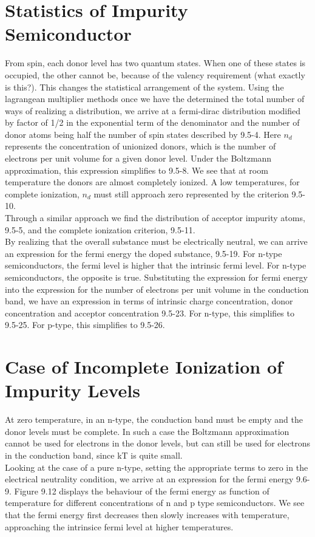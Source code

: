 \documentclass{article}
\numberwithin{equation}{section}
\begin{document}
\section*{Statistics of Impurity Semiconductor}From spin, each donor level has two quantum states. When one of these states is occupied, the other cannot be, because of the valency requirement (what exactly is this?). This changes the statistical arrangement of the system. Using the lagrangean multiplier methods once we have the determined the total number of ways of realizing a distribution, we arrive at a fermi-dirac distribution modified by factor of 1/2 in the exponential term of the denominator and the number of donor atoms being half the number of spin states described by 9.5-4. Here $n_d$ represents the concentration of unionized donors, which is the number of electrons per unit volume for a given donor level. Under the Boltzmann approximation, this expression simplifies to 9.5-8. We see that at room temperature the donors are almost completely ionized. A low temperatures, for complete ionization, $n_d$ must still approach zero represented by the criterion 9.5-10. \\
Through a similar approach we find the distribution of acceptor impurity atoms, 9.5-5, and the complete ionization criterion, 9.5-11.\\
By realizing that the overall substance must be electrically neutral, we can arrive an expression for the fermi energy the doped substance, 9.5-19. For n-type semiconductors, the fermi level is higher that the intrinsic fermi level. For n-type semiconductors, the opposite is true. Substituting the expression for fermi energy into the expression for the number of electrons per unit volume in the conduction band, we have an expression in terms of intrinsic charge concentration, donor concentration and acceptor concentration 9.5-23. For n-type, this simplifies to 9.5-25. For p-type, this simplifies to 9.5-26.\\
\section*{Case of Incomplete Ionization of Impurity Levels} At zero temperature, in an n-type, the conduction band must be empty and the donor levels must be complete. In such a case the Boltzmann approximation cannot be used for electrons in the donor levels, but can still be used for electrons in the conduction band, since kT is quite small. \\
Looking at the case of a pure n-type, setting the appropriate terms to zero in the electrical neutrality condition, we arrive at an expression for the fermi energy 9.6-9. Figure 9.12 displays the behaviour of the fermi energy as function of temperature for different concentrations of n and p type semiconductors. We see that the fermi energy first decreases then slowly increases with temperature, approaching the intrinsice fermi level at higher temperatures.
\end{document}

